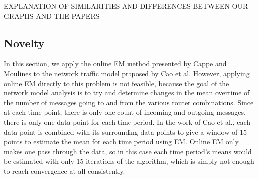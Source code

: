 \documentclass[12pt]{article}
\begin{document}




EXPLANATION OF SIMILARITIES AND DIFFERENCES BETWEEN OUR GRAPHS AND THE PAPERS


\newpage
\subsection{Novelty}
In this section, we apply the online EM method presented by Cappe and Moulines to the network traffic model proposed by Cao et al. However, applying online EM directly to this problem is not feasible, because the goal of the network model analysis is to try and determine changes in the mean overtime of  the number of messages going to and from the various router combinations.  Since at each time point, there is only one count of incoming and outgoing messages, there is only one data point for each time period. In the work of Cao et al., each data point is combined with its surrounding data points to give a window of 15 points to estimate the mean for each time period using EM. Online EM only makes one pass through the data, so in this case each time period's means would be estimated with only 15 iterations of the algorithm, which is simply not enough to reach convergence at all consistently.\\
\end{document}
